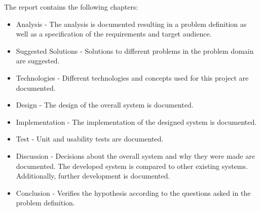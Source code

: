 The report contains the following chapters:
\begin{itemize}
\item Analysis - The analysis is documented resulting in a problem definition as well as a specification of the requirements and target audience.
\item Suggested Solutions - Solutions to different problems in the problem domain are suggested.
\item Technologies - Different technologies and concepts used for this project are documented.
\item Design - The design of the overall system is documented.
\item Implementation - The implementation of the designed system is documented.
\item Test - Unit and usability tests are documented. 
\item Discussion - Decisions about the overall system and why they were made are documented. The developed system is compared to other existing systems. Additionally, further development is documented.
\item Conclusion - Verifies the hypothesis according to the questions asked in the problem definition.
\end{itemize}